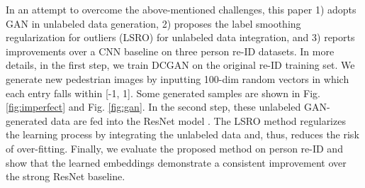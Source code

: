 \documentclass[10pt,twocolumn,letterpaper]{article}
\begin{document}
In an attempt to overcome the above-mentioned challenges, this paper 1) adopts GAN in unlabeled data generation, 2) proposes the label smoothing regularization for outliers (LSRO) for unlabeled data integration, and 3) reports improvements over a CNN baseline on three person re-ID datasets. In more details, in the first step, we train DCGAN \cite{radford2015unsupervised} on the original re-ID training set. We generate new pedestrian images by inputting 100-dim random vectors in which each entry falls within [-1, 1]. Some generated samples are shown in Fig. \ref{fig:imperfect} and Fig. \ref{fig:gan}.  In the second step, these unlabeled GAN-generated data are fed into the ResNet model \cite{he2016deep}. The LSRO method regularizes the learning process by integrating the unlabeled data and, thus, reduces the risk of over-fitting. 
Finally, we evaluate the proposed method on person re-ID and show that the learned embeddings demonstrate a consistent improvement over the strong ResNet baseline.




\end{document}
